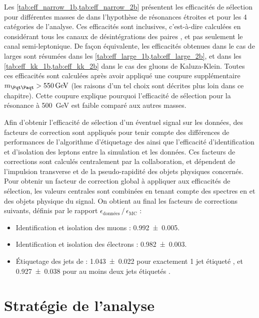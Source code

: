 Les \cref{tab:eff_narrow_1b,tab:eff_narrow_2b} présentent les efficacités de sélection pour différentes masses de \zprime dans l'hypothèse de résonances étroites et pour les 4 catégories de l'analyse. Ces efficacités sont inclusives, c'est-à-dire calculées en considérant tous les canaux de désintégrations des paires \ttbar, et pas seulement le canal semi-leptonique. De façon équivalente, les efficacités obtenues dans le cas de \zprime larges sont résumées dans les \cref{tab:eff_large_1b,tab:eff_large_2b}, et dans les \cref{tab:eff_kk_1b,tab:eff_kk_2b} dans le cas des gluons de Kaluza-Klein. Toutes ces efficacités sont calculées après avoir appliqué une coupure supplémentaire $\mtt > \SI{550}{\GeV}$ (les raisons d'un tel choix sont décrites plus loin dans ce chapitre). Cette coupure explique pourquoi l'efficacité de sélection pour la résonance à \SI{500}{\GeV} est faible comparé aux autres masses.

\bigskip

Afin d'obtenir l'efficacité de sélection d'un éventuel signal sur les données, des facteurs de correction sont appliqués pour tenir compte des différences de performances de l'algorithme d'étiquetage des \Pbottom ainsi que l'efficacité d'identification et d'isolation des leptons entre la simulation et les données. Ces facteurs de corrections sont calculés centralement par la collaboration, et dépendent de l'impulsion transverse et de la pseudo-rapidité des objets physiques concernés. Pour obtenir un facteur de correction global à appliquer aux efficacités de sélection, les valeurs centrales sont combinées en tenant compte des spectres en \pt et \aeta des objets physique du signal. On obtient au final les facteurs de corrections suivants, définis par le rapport $\epsilon_{\text{données}} \, / \, \epsilon_{\text{MC}}$ :
\begin{itemize}
  \item Identification et isolation des muons : \num{0.992 \pm 0.005}.
  \item Identification et isolation des électrons : \num{0.982 \pm 0.003}.
  \item Étiquetage des jets de \Pbottom : \num{1.043 \pm 0.022} pour exactement 1 jet étiqueté \Pbottom, et \num{0.927 \pm 0.038} pour au moins deux jets étiquetés \Pbottom.
\end{itemize}

\section{Stratégie de l'analyse}

